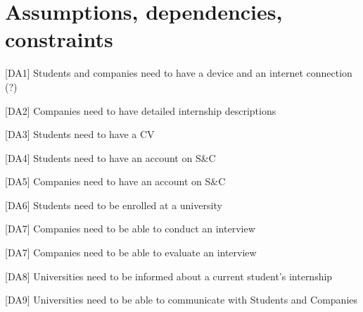 \section{Assumptions, dependencies, constraints}
[DA1] Students and companies need to have a device and an internet connection (?)

[DA2] Companies need to have detailed internship descriptions

[DA3] Students need to have a CV

[DA4] Students need to have an account on S\&C

[DA5] Companies need to have an account on S\&C

[DA6] Students need to be enrolled at a university 

[DA7] Companies need to be able to conduct an interview

[DA7] Companies need to be able to evaluate an interview

[DA8] Universities need to be informed about a current student's internship

[DA9] Universities need to be able to communicate with Students and Companies




